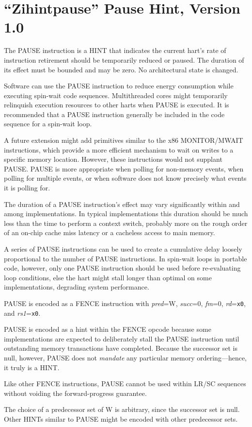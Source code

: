 \chapter{``Zihintpause'' Pause Hint, Version 1.0}
\label{chap:zihintpause}

The PAUSE instruction is a HINT that indicates the current hart's rate of
instruction retirement should be temporarily reduced or paused.  The duration of its
effect must be bounded and may be zero.  No architectural state is changed.

\begin{commentary}
Software can use the PAUSE instruction to reduce energy consumption while
executing spin-wait code sequences.  Multithreaded cores might temporarily
relinquish execution resources to other harts when PAUSE is executed.
It is recommended that a PAUSE instruction generally be included in the code
sequence for a spin-wait loop.

A future extension might add primitives similar to the x86 MONITOR/MWAIT
instructions, which provide a more efficient mechanism to wait on writes to
a specific memory location.
However, these instructions would not supplant PAUSE.
PAUSE is more appropriate when polling for non-memory events, when polling for
multiple events, or when software does not know precisely what events it is
polling for.

The duration of a PAUSE instruction's effect may vary significantly within and
among implementations.
In typical implementations this duration should be much less than the time to
perform a context switch, probably more on the rough order of an on-chip cache
miss latency or a cacheless access to main memory.

A series of PAUSE instructions can be used to create a cumulative delay loosely
proportional to the number of PAUSE instructions.
In spin-wait loops in portable code, however, only one PAUSE instruction should
be used before re-evaluating loop conditions, else the hart might stall longer
than optimal on some implementations, degrading system performance.
\end{commentary}

PAUSE is encoded as a FENCE instruction with {\em pred}=W, {\em succ}=0,
{\em fm}=0, {\em rd}={\tt x0}, and {\em rs1}={\tt x0}.

\begin{commentary}
PAUSE is encoded as a hint within the FENCE opcode because some
implementations are expected to deliberately stall the PAUSE instruction until outstanding
memory transactions have completed.
Because the successor set is null, however, PAUSE does not {\em mandate} any
particular memory ordering---hence, it truly is a HINT.

Like other FENCE instructions, PAUSE cannot be used within LR/SC sequences
without voiding the forward-progress guarantee.

The choice of a predecessor set of W is arbitrary, since the successor set is
null.
Other HINTs similar to PAUSE might be encoded with other predecessor sets.
\end{commentary}
